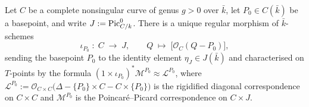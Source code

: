 \begin{lemma}
  Let \(C\) be a complete nonsingular curve of genus \(g > 0\) over \(\bar k\), let
  \(P_0 \in C(\bar k)\) be a basepoint, and write \(J := \operatorname{Pic}^0_{C/k}\). There is a
  unique regular morphism of \(\bar k\)-schemes
  \[
    \iota_{P_0} \;\colon\; C \;\longrightarrow\; J, \qquad
    Q \;\longmapsto\; \bigl[\mathcal O_C(Q - P_0)\bigr],
  \]
  sending the basepoint \(P_0\) to the identity element \(\eta_J \in J(\bar k)\)
  and characterised on \(T\)-points by the formula
  \((1 \times \iota_{P_0})^*\mathcal M^{P_0} \approx \mathcal L^{P_0}\), where
  \(\mathcal L^{P_0} := \mathcal O_{C \times C}\bigl(\Delta - \{P_0\} \times C -
  C \times \{P_0\}\bigr)\) is the rigidified diagonal correspondence on
  \(C \times C\) and \(\mathcal M^{P_0}\) is the Poincar\'e--Picard correspondence
  on \(C \times J\).
\end{lemma}

